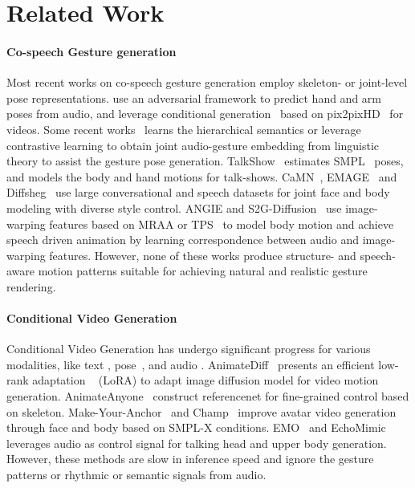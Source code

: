 
\section{Related Work}
\label{sec:background}


\vspace{-0.2 cm}
\paragraph{Co-speech Gesture generation}
Most recent works on co-speech gesture generation employ skeleton- or joint-level pose representations. 
\cite{ginosar2019gestures} use an adversarial framework to predict hand and arm poses from audio, and leverage conditional generation~\cite{EverybodyDanceNow} based on pix2pixHD~\cite{wang2018pix2pixHD} for videos. Some recent works~\cite{liu2022learning, Deichler_2023, xu2023chaingenerationmultimodalgesture, ao2022rhythmic} learns the hierarchical semantics or leverage contrastive learning to obtain joint audio-gesture embedding from linguistic theory to assist the gesture pose generation. TalkShow~\cite{yi2022generating} estimates SMPL~\cite{SMPL-X:2019} poses, and models the body and hand motions for talk-shows. CaMN~\cite{liu2022beat}, EMAGE~\cite{liu2023emage} and Diffsheg~\cite{diffsheg} use large conversational and speech datasets for joint face and body modeling with diverse style control. ANGIE \cite{angie} and S2G-Diffusion~\cite{s2gdiffusion} use image-warping features based on MRAA \cite{MRAA} or TPS~\cite{zhao2022thin} to model body motion and achieve speech driven animation by learning correspondence between audio and image-warping features. However, none of these works produce structure- and speech-aware motion patterns suitable for achieving natural and realistic gesture rendering.

\vspace{-0.2cm}
\paragraph{Conditional Video Generation}
Conditional Video Generation has undergo significant progress for various modalities, like text \cite{stablevideodiffusion}, pose~\cite{dreampose,wang2023disco}, and audio \cite{ruan2022mmdiffusion}. AnimateDiff~\cite{guo2023animatediff} presents an efficient low-rank adaptation ~\cite{hu2022lora} (LoRA) to adapt image diffusion model for video motion generation. AnimateAnyone~\cite{hu2023animateanyone} construct referencenet for fine-grained control based on skeleton. Make-Your-Anchor~\cite{huang2024makeyouranchor} and Champ~\cite{zhu2024champ} improve avatar video generation through face and body based on SMPL-X conditions. EMO~\cite{tian2024emo} and EchoMimic~\cite{meng2024echomimic} leverages audio as control signal for talking head and upper body generation. However, these methods are slow in inference speed and ignore the gesture patterns or rhythmic or semantic signals from audio.

